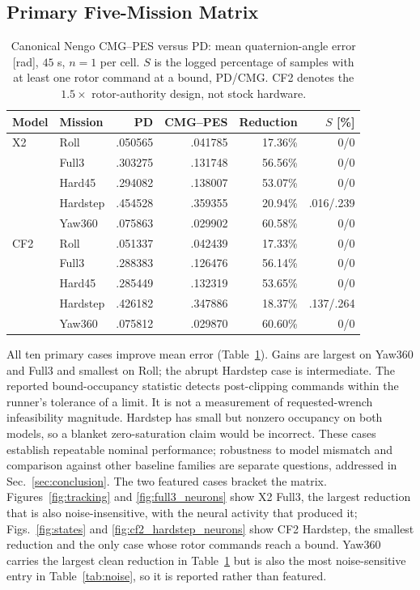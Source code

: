 \documentclass[letterpaper, 10 pt, conference]{ieeeconf}
\begin{document}
\subsection{Primary Five-Mission Matrix}
\begin{table}[h]
\caption{Canonical Nengo CMG--PES versus PD: mean quaternion-angle error
[rad], $45$ s, $n=1$ per cell. $S$ is the logged percentage of samples with
at least one rotor command at a bound, PD/CMG. CF2 denotes the $1.5\times$
rotor-authority design, not stock hardware.}
\label{tab:mujoco}\centering\scriptsize
\setlength{\tabcolsep}{3pt}
\begin{tabular}{llrrrr}
\toprule
Model&Mission&PD&CMG--PES&Reduction&$S$ [\%]\\\midrule
X2&Roll&.050565&.041785&17.36\%&0/0\\
&Full3&.303275&.131748&56.56\%&0/0\\
&Hard45&.294082&.138007&53.07\%&0/0\\
&Hardstep&.454528&.359355&20.94\%&.016/.239\\
&Yaw360&.075863&.029902&60.58\%&0/0\\\midrule
CF2&Roll&.051337&.042439&17.33\%&0/0\\
&Full3&.288383&.126476&56.14\%&0/0\\
&Hard45&.285449&.132319&53.65\%&0/0\\
&Hardstep&.426182&.347886&18.37\%&.137/.264\\
&Yaw360&.075812&.029870&60.60\%&0/0\\\bottomrule
\end{tabular}
\end{table}
All ten primary cases improve mean error (Table~\ref{tab:mujoco}). Gains
are largest on Yaw360 and Full3 and smallest on Roll; the abrupt Hardstep
case is intermediate. The reported bound-occupancy statistic detects
post-clipping commands within the runner's tolerance of a limit. It is not
a measurement of requested-wrench infeasibility magnitude. Hardstep has
small but nonzero occupancy on both models, so a blanket zero-saturation
claim would be incorrect. These cases establish repeatable nominal performance; robustness to model
mismatch and comparison against other baseline families are separate
questions, addressed in Sec.~\ref{sec:conclusion}. The two featured cases bracket the matrix. Figures~\ref{fig:tracking} and
\ref{fig:full3_neurons} show X2 Full3, the largest reduction that is also
noise-insensitive, with the neural activity that produced it;
Figs.~\ref{fig:states} and \ref{fig:cf2_hardstep_neurons} show CF2 Hardstep,
the smallest reduction and the only case whose rotor commands reach a bound.
Yaw360 carries the largest clean reduction in Table~\ref{tab:mujoco} but is
also the most noise-sensitive entry in Table~\ref{tab:noise}, so it is
reported rather than featured.
\end{document}
